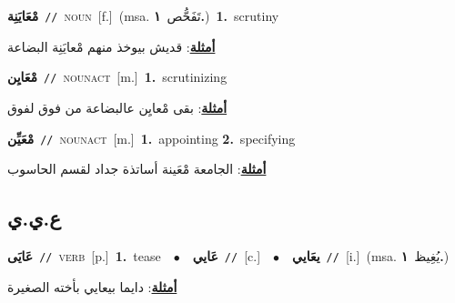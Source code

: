 \documentclass[10pt,a4paper,twoside]{article} %
\begin{document}
\begin{multicols}{2}
{\setlength\topsep{0pt}\textbf{\foreignlanguage{arabic}{مْعَايَنِة}}\ {\color{gray}\texttt{//}\color{black}}\ \textsc{noun}\ [f.]\ \color{gray}(msa. \foreignlanguage{arabic}{تَفَحُّص}~\foreignlanguage{arabic}{\textbf{١.}})\color{black}\ \textbf{1.}~scrutiny\  \begin{flushright}\color{gray}\foreignlanguage{arabic}{\textbf{\underline{\foreignlanguage{arabic}{أمثلة}}}: قديش بيوخذ منهم مْعايَنِة البضاعة}\end{flushright}\color{black}} \vspace{2mm}

{\setlength\topsep{0pt}\textbf{\foreignlanguage{arabic}{مْعَايِن}}\ {\color{gray}\texttt{//}\color{black}}\ \textsc{noun\textunderscore act}\ [m.]\ \textbf{1.}~scrutinizing\  \begin{flushright}\color{gray}\foreignlanguage{arabic}{\textbf{\underline{\foreignlanguage{arabic}{أمثلة}}}: بقى مْعايِن عالبضاعة من فوق لفوق}\end{flushright}\color{black}} \vspace{2mm}

{\setlength\topsep{0pt}\textbf{\foreignlanguage{arabic}{مْعَيِّن}}\ {\color{gray}\texttt{//}\color{black}}\ \textsc{noun\textunderscore act}\ [m.]\ \textbf{1.}~appointing  \textbf{2.}~specifying\  \begin{flushright}\color{gray}\foreignlanguage{arabic}{\textbf{\underline{\foreignlanguage{arabic}{أمثلة}}}: الجامعة مْعَينة أساتذة جداد لقسم الحاسوب}\end{flushright}\color{black}} \vspace{2mm}

\vspace{-3mm}
\subsection*{\color{blue}\foreignlanguage{arabic}{ع.ي.ي}\color{blue}{}} 

{\setlength\topsep{0pt}\textbf{\foreignlanguage{arabic}{عَايَى}}\ {\color{gray}\texttt{//}\color{black}}\ \textsc{verb}\ [p.]\ \textbf{1.}~tease\ \ $\bullet$\ \ \setlength\topsep{0pt}\textbf{\foreignlanguage{arabic}{عَايي}}\ {\color{gray}\texttt{//}\color{black}}\ [c.]\ \ $\bullet$\ \ \setlength\topsep{0pt}\textbf{\foreignlanguage{arabic}{يعَايي}}\ {\color{gray}\texttt{//}\color{black}}\ [i.]\ \color{gray}(msa. \foreignlanguage{arabic}{يُغِيظ}~\foreignlanguage{arabic}{\textbf{١.}})\color{black}\  \begin{flushright}\color{gray}\foreignlanguage{arabic}{\textbf{\underline{\foreignlanguage{arabic}{أمثلة}}}: دايما بيعايي بأخته الصغيرة}\end{flushright}\color{black}} \vspace{2mm}


\end{multicols}
\end{document}
